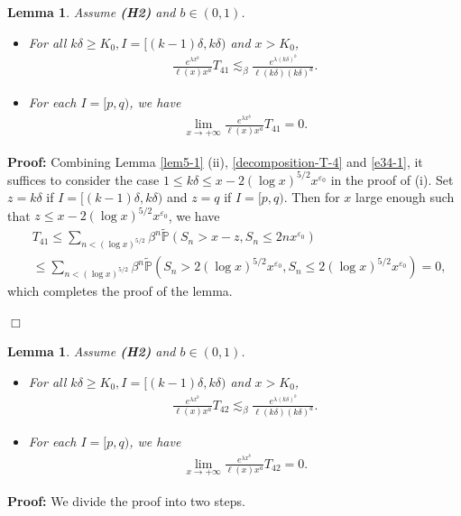 \documentclass[11pt]{article}
\newtheorem{lemma}[thrm]{Lemma}
\numberwithin{equation}{section}
\begin{document}
\begin{lemma}\label{lem5-3}
	Assume {\bf(H2)} and $b\in (0,1)$. 
	\begin{itemize}
		\item[(i)] For all $k\delta\geq K_0, I=[(k-1)\delta, k\delta)$ and $x>K_0$, 
		\begin{align}
			\frac{e^{\lambda x^b}}{\ell(x)x^a } T_{41} \lesssim_\beta  \frac{e^{\lambda (k\delta)^b}}{\ell(k\delta) (k\delta)^a}.
		\end{align}
		\item[(ii)] For each $I=[p,q)$, we have 
		\begin{align}
			\lim_{x\to+\infty}\frac{e^{\lambda x^b}}{\ell(x)x^a } T_{41}  =0. 
		\end{align}
	\end{itemize}
\end{lemma}
\textbf{Proof: }  Combining Lemma \ref{lem5-1} (ii), \eqref{decomposition-T-4} and \eqref{e34-1}, it suffices to consider the case $1\leq k\delta \leq x-2(\log x)^{5/2} x^{\varepsilon_0}$ in the proof of (i). Set $z=k\delta$ if $I=[(k-1)\delta, k\delta)$ and $z=q$ if $I=[p,q)$. Then for $x$ large enough such that   
$z \leq x-2(\log x)^{5/2} x^{\varepsilon_0}$, we have 
\begin{align}\label{e34-2}
	&T_{41} \leq \sum_{n<(\log x)^{5/2}}  \beta^{n}\widetilde{\mathbb{P}}\left(  S_n>x- z,   S_n \leq 2nx^{\varepsilon_0}\right) \nonumber\\
	& \leq \sum_{n<(\log x)^{5/2}}  \beta^{n} \widetilde{\mathbb{P}}\left(  S_n>2(\log x)^{5/2} x^{\varepsilon_0},   S_n \leq 2(\log x)^{5/2}x^{\varepsilon_0}\right)=0,
\end{align}
which completes the proof of the lemma. 

\hfill$\Box$

\begin{lemma}\label{lem5-4}
	Assume {\bf(H2)} and $b\in (0,1)$. 
	\begin{itemize}
		\item[(i)] For all $k\delta\geq K_0, I=[(k-1)\delta, k\delta)$ and $x>K_0$, 
		\begin{align}
			\frac{e^{\lambda x^b}}{\ell(x)x^a } T_{42} \lesssim_\beta  \frac{e^{\lambda (k\delta)^b}}{\ell(k\delta) (k\delta)^a}.
		\end{align}
		\item[(ii)] For each $I=[p,q)$, we have 
		\begin{align}
			\lim_{x\to+\infty}\frac{e^{\lambda x^b}}{\ell(x)x^a } T_{42}  =0. 
		\end{align}
	\end{itemize}
\end{lemma}
\textbf{Proof: }  We divide the proof into two steps.
\end{document}
